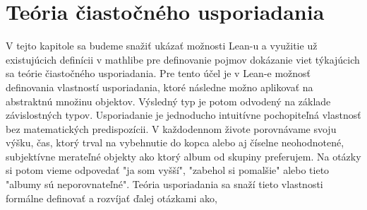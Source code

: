 \documentclass[a4paper,10pt,oneside]{report}%
\begin{document}
\chapter{Teória čiastočného usporiadania}
    V tejto kapitole sa budeme snažiť ukázať možnosti Lean-u a využitie už existujúcich
definícii v mathlibe pre definovanie pojmov dokázanie viet týkajúcich sa teórie 
čiastočného usporiadania.
    Pre tento účel je v Lean-e možnosť definovania vlastností usporiadania,
ktoré následne možno aplikovať na abstraktnú množinu objektov.
    Výsledný typ je potom odvodený na základe závislostných typov.
    Usporiadanie je jednoducho intuitívne pochopiteľná vlastnosť bez matematických
predispozícii.
    V každodennom živote porovnávame svoju výšku, čas, ktorý trval na vybehnutie do kopca
alebo aj číselne neohodnotené, subjektívne merateľné objekty ako ktorý album
od skupiny preferujem.
    Na otázky si potom vieme odpovedať "ja som vyšší", "zabehol si pomalšie" alebo
tieto "albumy sú neporovnateľné".
    Teória usporiadania sa snaží tieto vlastnosti formálne definovať a rozvíjať ďalej
otázkami ako,
\end{document}

